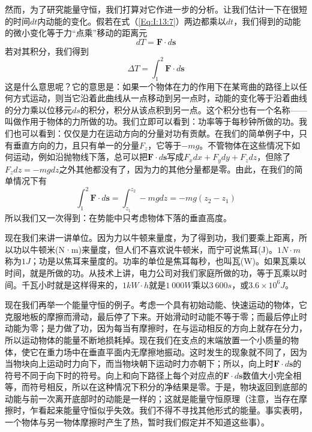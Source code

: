 然而，为了研究能量守恒，我们打算对它作进一步的分析。让我们估计一下在很短的时间$dt$内动能的变化。假若在式（\ref{Eq:I:13:7}）两边都乘以$dt$，我们得到的动能的微小变化等于力“点乘”移动的距离元
\begin{equation}
    \label{Eq:I:13:8}
    dT=\boldsymbol{F} \cdot d\boldsymbol{s}
\end{equation}
若对其积分，我们得到
\begin{equation}
    \label{Eq:I:13:9}
    \Delta T=\int_{1}^{2} \boldsymbol{F} \cdot d\boldsymbol{s}
\end{equation}
这是什么意思呢？它的意思是：如果一个物体在力的作用下在某弯曲的路径上以任何方式运动，则当它沿着此曲线从一点移动到另一点时，动能的变化等于沿着曲线的分力乘以位移元$ds$的积分，积分从该点积到另一点。这个积分也有一个名称——叫做作用于物体的力所做的功。我们立即可以看到：功率等于每秒钟所做的功。我们也可以看到：仅仅是力在运动方向的分量对功有贡献。在我们的简单例子中，只有垂直方向的力，且只有单一的分量$F_z$，它等于$-mg$。不管物体在这些情况下如何运动，例如沿抛物线下落，总可以把$\boldsymbol{F} \cdot d\boldsymbol{s}$写成$F_xdx+F_ydy+F_zdz$，但除了$F_zdz=-mgdz$之外其他都没有了，因为力的其他分量都是零。由此，在我们的简单情况下有
\begin{equation}
    \label{Eq:I:13:10}
    \int_{1}^{2} \boldsymbol{F} \cdot d\boldsymbol{s}=\int_{z_1}^{z_2} -mgdz = -mg(z_2-z_1) 
\end{equation}
所以我们又一次得到：在势能中只考虑物体下落的垂直高度。

现在我们来讲一讲单位。因为力以牛顿来量度，为了得到功，我们要乘上距离，所以功以牛顿米(N·m)来量度，但人们不喜欢说牛顿米，而宁可说焦耳(J)。$1 N \cdot m$称为$1 J$；功是以焦耳来量度的。功率的单位是焦耳每秒，也叫瓦(W)。如果瓦乘以时间，就是所做的功。从技术上讲，电力公司对我们家庭所做的功，等于瓦乘以时间。千瓦小时就是这样得来的，$1 kW \cdot h$就是$1~000 W$乘以$3~600 s$，或$3.6 \times 10^6J$。

现在我们再举一个能量守恒的例子。考虑一个具有初始动能、快速运动的物体，它克服地板的摩擦而滑动，最后停了下来。开始滑动时动能不等于零；而最后停止时动能为零；是力做了功，因为每当有摩擦时，在与运动相反的方向上就存在分力，所以运动物体的能量不断地损耗掉。现在我们在支点的末端放置一个小质量的物体，使它在重力场中在垂直平面内无摩擦地振动。这时发生的现象就不同了，因为当物块向上运动时力向下，而当物块朝下运动时力亦朝下；所以，向上时$\boldsymbol{F} \cdot d\boldsymbol{s}$的符号不同于向下时的符号。向上和向下路径上每个对应点的$\boldsymbol{F} \cdot d\boldsymbol{s}$数值大小完全相等，而符号相反，所以在这种情况下积分的净结果是零。于是，物块返回到底部的动能与前一次离开底部时的动能是一样的；这就是能量守恒原理（注意，当存在摩擦时，乍看起来能量守恒似乎失效。我们不得不寻找其他形式的能量。事实表明，一个物体与另一物体摩擦时产生了热，暂时我们假定并不知道这些事）。

